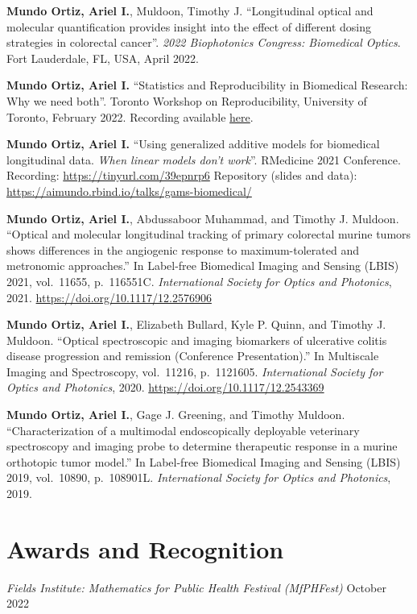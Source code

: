 \documentclass[10pt,]{article}
\begin{document}
\textbf{Mundo Ortiz, Ariel I.}, Muldoon, Timothy J. ``Longitudinal
optical and molecular quantification provides insight into the effect of
different dosing strategies in colorectal cancer''. \emph{2022
Biophotonics Congress: Biomedical Optics}. Fort Lauderdale, FL, USA,
April 2022.

\textbf{Mundo Ortiz, Ariel I.} ``Statistics and Reproducibility in
Biomedical Research: Why we need both''. Toronto Workshop on
Reproducibility, University of Toronto, February 2022. Recording
available \href{https://www.youtube.com/watch?v=Fvkp20X5xwA}{here}.

\textbf{Mundo Ortiz, Ariel I.} ``Using generalized additive models for
biomedical longitudinal data. \emph{When linear models don't work}''.
RMedicine 2021 Conference. Recording: \url{https://tinyurl.com/39epnrp6}
Repository (slides and data):
\url{https://aimundo.rbind.io/talks/gams-biomedical/}

\textbf{Mundo Ortiz, Ariel I.}, Abdussaboor Muhammad, and Timothy J.
Muldoon. ``Optical and molecular longitudinal tracking of primary
colorectal murine tumors shows differences in the angiogenic response to
maximum-tolerated and metronomic approaches.'' In Label-free Biomedical
Imaging and Sensing (LBIS) 2021, vol.~11655, p.~116551C.
\emph{International Society for Optics and Photonics}, 2021.
\url{https://doi.org/10.1117/12.2576906}

\textbf{Mundo Ortiz, Ariel I.}, Elizabeth Bullard, Kyle P. Quinn, and
Timothy J. Muldoon. ``Optical spectroscopic and imaging biomarkers of
ulcerative colitis disease progression and remission (Conference
Presentation).'' In Multiscale Imaging and Spectroscopy, vol.~11216,
p.~1121605. \emph{International Society for Optics and Photonics}, 2020.
\url{https://doi.org/10.1117/12.2543369}

\textbf{Mundo Ortiz, Ariel I.}, Gage J. Greening, and Timothy Muldoon.
``Characterization of a multimodal endoscopically deployable veterinary
spectroscopy and imaging probe to determine therapeutic response in a
murine orthotopic tumor model.'' In Label-free Biomedical Imaging and
Sensing (LBIS) 2019, vol.~10890, p.~108901L. \emph{International Society
for Optics and Photonics}, 2019.

\section{Awards and Recognition}\label{awards-and-recognition}

\emph{Fields Institute: Mathematics for Public Health Festival
(MfPHFest)} \hfill October 2022
\end{document}
